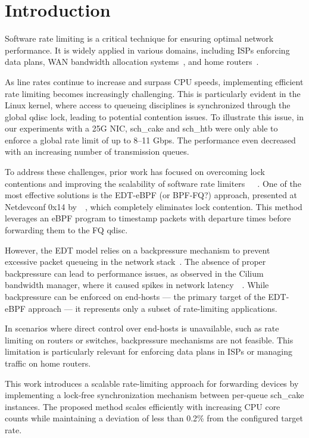 \section{Introduction}

Software rate limiting is a critical technique for ensuring optimal network performance. It is widely applied in various domains, including ISPs enforcing data plans, WAN bandwidth allocation systems~\cite{bwe}, and home routers~\cite{cake}.

As line rates continue to increase and surpass CPU speeds, implementing efficient rate limiting becomes increasingly challenging. This is particularly evident in the Linux kernel, where access to queueing disciplines is synchronized through the global qdisc lock, leading to potential contention issues.
To illustrate this issue, in our experiments with a 25G NIC, sch\_cake and sch\_htb were only able to enforce a global rate limit of up to 8--11 Gbps. The performance even decreased with an increasing number of transmission queues.

To address these challenges, prior work has focused on overcoming lock contentions and improving the scalability of software rate limiters~\cite{eyeq}~\cite{carousel}~\cite{edt-ebpf}. One of the most effective solutions is the EDT-eBPF (or BPF-FQ?) approach, presented at Netdevconf 0x14 by~\citeauthor{edt-ebpf}~\cite{edt-ebpf}, which completely eliminates lock contention. This method leverages an eBPF program to timestamp packets with departure times before forwarding them to the FQ qdisc.

However, the EDT model relies on a backpressure mechanism to prevent excessive packet queueing in the network stack~\cite{carousel}. The absence of proper backpressure can lead to performance issues, as observed in the Cilium bandwidth manager, where it caused spikes in network latency~\cite{edt-issue}~\cite{fifo-in-the-cloud}. While backpressure can be enforced on end-hosts --- the primary target of the EDT-eBPF approach --- it represents only a subset of rate-limiting applications.

In scenarios where direct control over end-hosts is unavailable, such as rate limiting on routers or switches, backpressure mechanisms are not feasible. This limitation is particularly relevant for enforcing data plans in ISPs or managing traffic on home routers.

This work introduces a scalable rate-limiting approach for forwarding devices by implementing a lock-free synchronization mechanism between per-queue sch\_cake instances. The proposed method scales efficiently with increasing CPU core counts while maintaining a deviation of less than 0.2\% from the configured target rate.